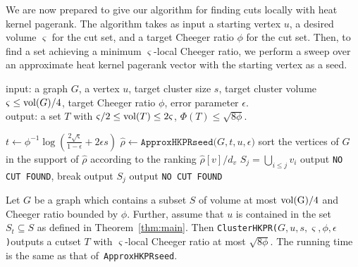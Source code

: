 \documentclass[runningheads,a4paper]{llncs}
\newcommand{\vol}{\textmd{vol}}
\newcommand{\hkprseedalg}{\texttt{ApproxHKPRseed}}
\newcommand{\hkprseedalgparams}{\texttt{ApproxHKPRseed($G,t,u,\epsilon$)}}
\newcommand{\partitionalgparams}{\texttt{ClusterHKPR($G,u,s,\varsigma,\phi,\epsilon$)}}
\newcommand{\tparamcluster}{\phi^{-1}\log(\frac{2\sqrt{\varsigma}}{1-\epsilon} + 2\epsilon s)}
\begin{document}
We are now prepared to give our algorithm for finding cuts locally with heat
kernel pagerank.  The algorithm takes as input a starting vertex $u$, a desired
volume $\varsigma$ for the cut set, and a target Cheeger ratio $\phi$ for the
cut set.  Then, to find a set achieving a minimum $\varsigma$-local Cheeger
ratio, we perform a sweep over an approximate heat kernel pagerank vector with
the starting vertex as a seed.

\begin{algorithm}[H]
\caption*{\partitionalgparams}
\label{alg:localpart}
input: a graph $G$, a vertex $u$, target cluster size $s$, target cluster volume
$\varsigma \leq \vol(G)/4$, target Cheeger ratio $\phi$, error parameter
$\epsilon$.\\
output: a set $T$ with $\varsigma/2 \leq \vol(T) \leq 2\varsigma$,
$\Phi(T) \leq \sqrt{8\phi}$.\\
\begin{algorithmic}[1]
  \State $t \gets \tparamcluster$
  \State $\hat{\rho} \gets \hkprseedalgparams$\label{line:hkpr}
  \State sort the vertices of $G$ in the support of $\hat{\rho}$ according to the ranking
$\hat{\rho}[v]/d_{v}$\label{line:sort}
  \label{line:sweep}
    \State $S_j = \bigcup_{i\leq j}v_i$
    \If{$\vol(S_j) > 2\varsigma$}\label{line:volume}
      \State output \texttt{NO CUT FOUND}, break
    \ElsIf{$\varsigma/2 \leq \vol(S_j) \leq 2\varsigma$ and $\Phi(S_j) \leq \sqrt{8\phi}$}\label{line:checks}
      \State output $S_j$
    \Else
      \State output \texttt{NO CUT FOUND}
    \EndIf
  \EndFor
\end{algorithmic}
\end{algorithm}

\begin{theorem}{\label{thm:localpart}}
Let $G$ be a graph which contains a subset $S$ of volume at most $\rm{vol}(G)/4$
and Cheeger ratio bounded by $\phi$.  Further, assume that $u$ is contained in
the set $S_t\subseteq S$ as defined in Theorem~\ref{thm:main}.  Then
\partitionalgparams outputs a cutset $T$ with $\varsigma$-local Cheeger ratio at
most $\sqrt{8\phi}$.  The running time is the same as that of~\hkprseedalg.
\end{theorem}
\end{document}
